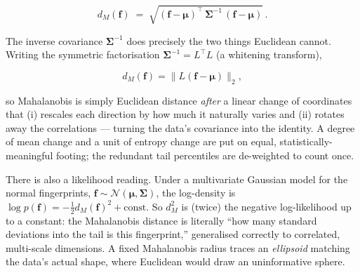 \documentclass[11pt]{article}
\theoremstyle{definition}
\newcommand{\fvec}{\mathbf{f}}
\newcommand{\Cov}{\boldsymbol{\Sigma}}
\begin{document}
\begin{equation}
  d_M(\fvec) \;=\; \sqrt{(\fvec - \boldsymbol{\mu})^{\!\top}\, \Cov^{-1}\, (\fvec - \boldsymbol{\mu})}\,.
\end{equation}

The inverse covariance $\Cov^{-1}$ does precisely the two things Euclidean cannot. Writing the
symmetric factorisation $\Cov^{-1} = L^\top L$ (a whitening transform), 

\begin{equation}
  d_M(\fvec) = \big\| L(\fvec - \boldsymbol{\mu}) \big\|_2 ,
\end{equation}

so Mahalanobis is simply Euclidean distance \emph{after} a linear change of coordinates that
(i) rescales each direction by how much it naturally varies and (ii) rotates away the correlations
--- turning the data's covariance into the identity. A degree of mean change and a unit of entropy
change are put on equal, statistically-meaningful footing; the redundant tail percentiles are
de-weighted to count once.

There is also a likelihood reading. Under a multivariate Gaussian model for the normal fingerprints,
$\fvec \sim \mathcal{N}(\boldsymbol{\mu}, \Cov)$, the log-density is
$\log p(\fvec) = -\tfrac{1}{2} d_M(\fvec)^2 + \text{const}$. So $d_M^2$ is (twice) the negative
log-likelihood up to a constant: the Mahalanobis distance is literally ``how many standard deviations
into the tail is this fingerprint,'' generalised correctly to correlated, multi-scale dimensions. A
fixed Mahalanobis radius traces an \emph{ellipsoid} matching the data's actual shape, where Euclidean
would draw an uninformative sphere.
\end{document}
